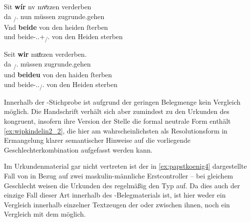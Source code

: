 \begin{exe}
\ex \label{ex:wipkindelin2}
	\begin{xlist}
	\ex \label{ex:wipkindelin2_1}
		\begin{taggedline}{\parencite[\pno~5\rb, 33--34]{kc:VB}}
		\gll Sit \textbf{wír} nv mvͤzzen verderben \\
			da \Fpl\textsubscript{\SF/\SX}.\Nom{} nun müssen zugrunde.gehen \\
	\sn \gll Vnd \textbf{beide} von den heiden ſterben \\
			und beide-\Nom.\Pl.\M+\F\textsubscript{\SF/\SX}.\St{} von den Heiden
				sterben \\
		\end{taggedline}
		
	\ex \label{ex:wipkindelin2_2}
		\gll Seit \textbf{wir} muͤzzen verderben. \\
			da \Fpl\textsubscript{\SF/\SX}.\Nom{} müssen zugrunde.gehen \\
	\sn \gll und \textbf{beideu} von den haiden ſterben \\
			und beide-\Nom.\Pl.\N\textsubscript{\SF/\SX}.\St{} von den Heiden
				sterben \\
		\begin{taggedline}{\parencites[\pno~4\vb, 57--58]{kc:B1}[vgl. abweichend][931--932]{schroeder1895}}
		\trans {}
		\end{taggedline}
	\end{xlist}
\end{exe}

Innerhalb der \citet{kc}-Stichprobe ist aufgrund der geringen Belegmenge
kein Vergleich möglich. Die Handschrift \citet{kc:B1} verhält sich aber
zumindest zu den Urkunden des \CAO{} kongruent, insofern ihre Version
der Stelle die formal neutrale Form  enthält
\cref{ex:wipkindelin2_2}, die hier am wahrscheinlichsten als Resolutionsform in
Ermangelung klarer semantischer Hinweise auf die vorliegende
Geschlechterkombination aufgefasst werden kann.

Im Urkundenmaterial gar nicht vertreten ist der in \cref{ex:papstkoenig4}
dargestellte Fall von  in Bezug auf zwei maskulin-männliche
Erstcontroller -- bei gleichem Geschlecht weisen die Urkunden des
\CAO{} regelmäßig den Typ  auf. Da dies auch der einzige
Fall dieser Art innerhalb des \citet{kc}-Belegmaterials ist, ist hier weder
ein Vergleich innerhalb einzelner Textzeugen der \citet{kc} oder zwischen
ihnen, noch ein Vergleich mit dem \CAO{} möglich.

